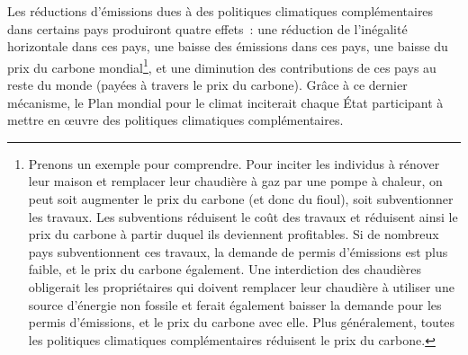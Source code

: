 \documentclass[a5paper,french,openany]{memoir}
\begin{document}
Les réductions d'émissions dues à des politiques climatiques complémentaires dans certains pays 
produiront quatre effets~: une réduction de l'inégalité horizontale dans ces pays, une baisse des émissions dans ces pays, une baisse du prix du carbone mondial\footnote{Prenons un exemple pour comprendre. 
Pour inciter les individus à rénover leur maison et remplacer leur chaudière à gaz par une pompe à chaleur, on peut soit augmenter le prix du carbone (et donc du fioul), soit subventionner les travaux. 
Les subventions réduisent le coût des travaux et réduisent ainsi le prix du carbone à partir duquel ils deviennent profitables. 
Si de nombreux pays subventionnent ces travaux, %
la demande de permis d'émissions est plus faible, et le prix du carbone également. 
Une interdiction des chaudières obligerait les propriétaires qui doivent remplacer leur chaudière à utiliser une source d'énergie non fossile et ferait également baisser la demande pour les permis d'émissions, et le prix du carbone avec elle. Plus généralement, toutes les politiques climatiques complémentaires réduisent le prix du carbone.}, 
et une diminution des contributions de ces pays au reste du monde (payées à travers le prix du carbone). Grâce à ce dernier mécanisme, le Plan mondial pour le climat inciterait chaque État participant à mettre en œuvre des politiques climatiques complémentaires. 
\end{document}
